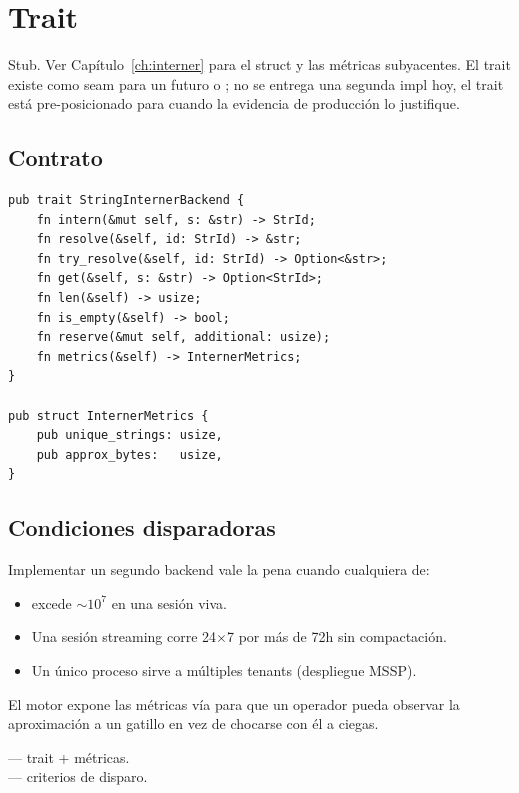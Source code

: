 \chapter{Trait }
\label{ch:interner-trait}

\begin{note}
Stub. Ver Capítulo~\ref{ch:interner} para el struct y las
métricas subyacentes. El trait existe como seam para un futuro
 o ; no se
entrega una segunda impl hoy, el trait está pre-posicionado
para cuando la evidencia de producción lo justifique.
\end{note}

\section{Contrato}

\begin{lstlisting}[style=rust]
pub trait StringInternerBackend {
    fn intern(&mut self, s: &str) -> StrId;
    fn resolve(&self, id: StrId) -> &str;
    fn try_resolve(&self, id: StrId) -> Option<&str>;
    fn get(&self, s: &str) -> Option<StrId>;
    fn len(&self) -> usize;
    fn is_empty(&self) -> bool;
    fn reserve(&mut self, additional: usize);
    fn metrics(&self) -> InternerMetrics;
}

pub struct InternerMetrics {
    pub unique_strings: usize,
    pub approx_bytes:   usize,
}
\end{lstlisting}

\section{Condiciones disparadoras}

Implementar un segundo backend vale la pena cuando cualquiera
de:
\begin{itemize}
    \item {} excede $\sim 10^7$ en
        una sesión viva.
    \item Una sesión streaming corre 24$\times$7 por más de 72h
        sin compactación.
    \item Un único proceso sirve a múltiples tenants
        (despliegue MSSP).
\end{itemize}

El motor expone las métricas vía
 para que un operador pueda
observar la aproximación a un gatillo en vez de chocarse con
él a ciegas.

\begin{inthecode}
 --- trait +
métricas.\\
 --- criterios de disparo.
\end{inthecode}
